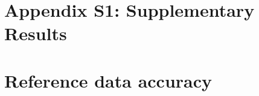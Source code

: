 \documentclass[11pt, titlepage]{article}
\begin{document}
%

\setpagewiselinenumbers
\section*{\large Appendix S1: Supplementary Results}
\section*{Reference data accuracy}
\end{document}
